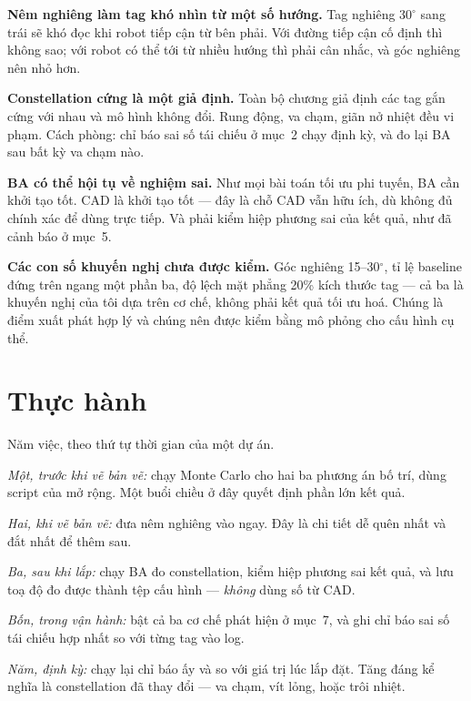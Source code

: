 \documentclass[../../marker.tex]{subfiles}
\begin{document}
\textbf{Nêm nghiêng làm tag khó nhìn từ một số hướng.} Tag nghiêng \(30^\circ\) sang trái sẽ khó đọc khi robot tiếp cận từ bên phải. Với đường tiếp cận cố định thì không sao; với robot có thể tới từ nhiều hướng thì phải cân nhắc, và góc nghiêng nên nhỏ hơn.

\textbf{Constellation cứng là một giả định.} Toàn bộ chương giả định các tag gắn cứng với nhau và mô hình không đổi. Rung động, va chạm, giãn nở nhiệt đều vi phạm. Cách phòng: chỉ báo sai số tái chiếu ở mục~2 chạy định kỳ, và đo lại BA sau bất kỳ va chạm nào.

\textbf{BA có thể hội tụ về nghiệm sai.} Như mọi bài toán tối ưu phi tuyến, BA cần khởi tạo tốt. CAD là khởi tạo tốt --- đây là chỗ CAD vẫn hữu ích, dù không đủ chính xác để dùng trực tiếp. Và phải kiểm hiệp phương sai của kết quả, như đã cảnh báo ở mục~5.

\textbf{Các con số khuyến nghị chưa được kiểm.} Góc nghiêng 15--30\(^\circ\), tỉ lệ baseline đứng trên ngang một phần ba, độ lệch mặt phẳng 20\% kích thước tag --- cả ba là khuyến nghị của tôi dựa trên cơ chế, không phải kết quả tối ưu hoá. Chúng là điểm xuất phát hợp lý và chúng nên được kiểm bằng mô phỏng cho cấu hình cụ thể.

\section{Thực hành}

Năm việc, theo thứ tự thời gian của một dự án.

\emph{Một, trước khi vẽ bản vẽ:} chạy Monte Carlo cho hai ba phương án bố trí, dùng script của  mở rộng. Một buổi chiều ở đây quyết định phần lớn kết quả.

\emph{Hai, khi vẽ bản vẽ:} đưa nêm nghiêng vào ngay. Đây là chi tiết dễ quên nhất và đắt nhất để thêm sau.

\emph{Ba, sau khi lắp:} chạy BA đo constellation, kiểm hiệp phương sai kết quả, và lưu toạ độ đo được thành tệp cấu hình --- \emph{không} dùng số từ CAD.

\emph{Bốn, trong vận hành:} bật cả ba cơ chế phát hiện ở mục~7, và ghi chỉ báo sai số tái chiếu hợp nhất so với từng tag vào log.

\emph{Năm, định kỳ:} chạy lại chỉ báo ấy và so với giá trị lúc lắp đặt. Tăng đáng kể nghĩa là constellation đã thay đổi --- va chạm, vít lỏng, hoặc trôi nhiệt.
\end{document}
